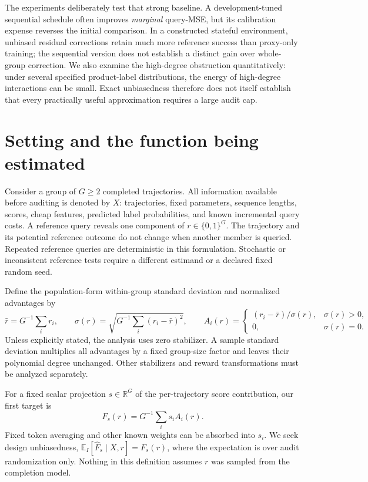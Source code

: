 \documentclass[11pt]{article}
\newcommand{\E}{\mathbb E}
\newcommand{\R}{\mathbb R}
\begin{document}
The experiments deliberately test that strong baseline. A development-tuned sequential schedule often improves \emph{marginal} query-MSE, but its calibration expense reverses the initial comparison. In a constructed stateful environment, unbiased residual corrections retain much more reference success than proxy-only training; the sequential version does not establish a distinct gain over whole-group correction. We also examine the high-degree obstruction quantitatively: under several specified product-label distributions, the energy of high-degree interactions can be small. Exact unbiasedness therefore does not itself establish that every practically useful approximation requires a large audit cap.

\section{Setting and the function being estimated}\label{sec:setting}
Consider a group of $G\ge2$ completed trajectories. All information available before auditing is denoted by $X$: trajectories, fixed parameters, sequence lengths, scores, cheap features, predicted label probabilities, and known incremental query costs. A reference query reveals one component of $r\in\{0,1\}^G$. The trajectory and its potential reference outcome do not change when another member is queried. Repeated reference queries are deterministic in this formulation. Stochastic or inconsistent reference tests require a different estimand or a declared fixed random seed.

Define the population-form within-group standard deviation and normalized advantages by
\begin{equation}\label{eq:adv}
 \bar r=G^{-1}\sum_i r_i,\qquad
 \sigma(r)=\sqrt{G^{-1}\sum_i(r_i-\bar r)^2},\qquad
 A_i(r)=\begin{cases}(r_i-\bar r)/\sigma(r),&\sigma(r)>0,\\0,&\sigma(r)=0.\end{cases}
\end{equation}
Unless explicitly stated, the analysis uses zero stabilizer. A sample standard deviation multiplies all advantages by a fixed group-size factor and leaves their polynomial degree unchanged. Other stabilizers and reward transformations must be analyzed separately.

For a fixed scalar projection $s\in\R^G$ of the per-trajectory score contribution, our first target is
\begin{equation}\label{eq:F}
 F_s(r)=G^{-1}\sum_i s_i A_i(r).
\end{equation}
Fixed token averaging and other known weights can be absorbed into $s_i$. We seek design unbiasedness, $\E_I[\widehat F_s\mid X,r]=F_s(r)$, where the expectation is over audit randomization only. Nothing in this definition assumes $r$ was sampled from the completion model.
\end{document}
